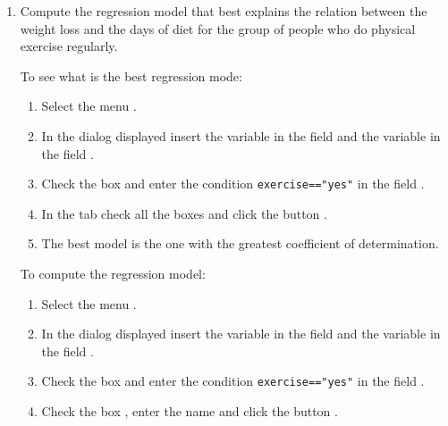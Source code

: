 \begin{enumerate}[leftmargin=*]
\begin{enumerate}
\item Compute the regression model that best explains the relation between the weight loss and the days of diet for the
group of people who do physical exercise regularly.
\begin{indication}
To see what is the best regression mode:
\begin{enumerate}
\item Select the menu .
\item In the dialog displayed insert the variable  in the field  and the
variable  in the field .
\item Check the box  and enter the condition \lstinline{exercise=="yes"} in the field .
\item In the  tab check all the boxes and click the button .
\item The best model is the one with the greatest coefficient of determination.
\end{enumerate}
To compute the regression model:
\begin{enumerate}
\item Select the menu .
\item In the dialog displayed insert the variable  in the field  and the
variable  in the field .
\item Check the box  and enter the condition \lstinline{exercise=="yes"} in the field
.
\item Check the box , enter the name  and click
the button .
\end{enumerate}
\end{indication}


\end{enumerate}
\end{enumerate}
